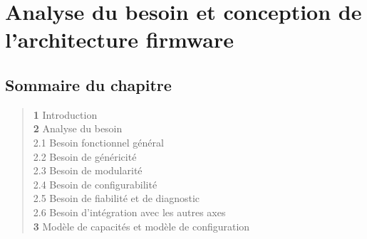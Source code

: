 \chapter{Analyse du besoin et conception de l'architecture firmware}

\section*{Sommaire du chapitre}
\begin{quote}
\small
\textbf{1} \hspace{1em} Introduction \dotfill \pageref{sec:intro_ch3}\\
\textbf{2} \hspace{1em} Analyse du besoin \dotfill \pageref{sec:analyse_besoin}\\
\hspace{2.5em} 2.1 \hspace{0.5em} Besoin fonctionnel général \dotfill \pageref{subsec:besoin_fonc}\\
\hspace{2.5em} 2.2 \hspace{0.5em} Besoin de généricité \dotfill \pageref{subsec:besoin_gen}\\
\hspace{2.5em} 2.3 \hspace{0.5em} Besoin de modularité \dotfill \pageref{subsec:besoin_mod}\\
\hspace{2.5em} 2.4 \hspace{0.5em} Besoin de configurabilité \dotfill \pageref{subsec:besoin_config}\\
\hspace{2.5em} 2.5 \hspace{0.5em} Besoin de fiabilité et de diagnostic \dotfill \pageref{subsec:besoin_fiab}\\
\hspace{2.5em} 2.6 \hspace{0.5em} Besoin d'intégration avec les autres axes \dotfill \pageref{subsec:besoin_integ}\\
\textbf{3} \hspace{1em} Modèle de capacités et modèle de configuration \dotfill \pageref{sec:capabilities}\\

\end{quote}
